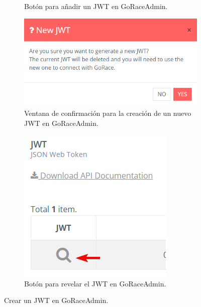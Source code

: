 \begin{figure}
\begin{subfigure}{0.28\textwidth}
        \caption{Botón para añadir un JWT en GoRaceAdmin.}
        \label{fig:go-admin-add-jwt-btn}
    \end{subfigure}
    \hspace*{\fill}
    \begin{subfigure}{0.28\textwidth}
        \includegraphics[width=\linewidth]{images/go-admin-add-jwt-prompt.png}
        \caption{Ventana de confirmación para la creación de un nuevo JWT en GoRaceAdmin.}
        \label{fig:go-admin-add-jwt-prompt}
    \end{subfigure}
    \hspace*{\fill}
    \begin{subfigure}{0.18\textwidth}
        \includegraphics[width=\linewidth]{images/go-admin-add-jwt-reveal.png}
        \caption{Botón para revelar el JWT en GoRaceAdmin.}
        \label{fig:go-admin-add-jwt-reveal}
    \end{subfigure}
    \caption{Crear un JWT en GoRaceAdmin.}
\end{figure}

